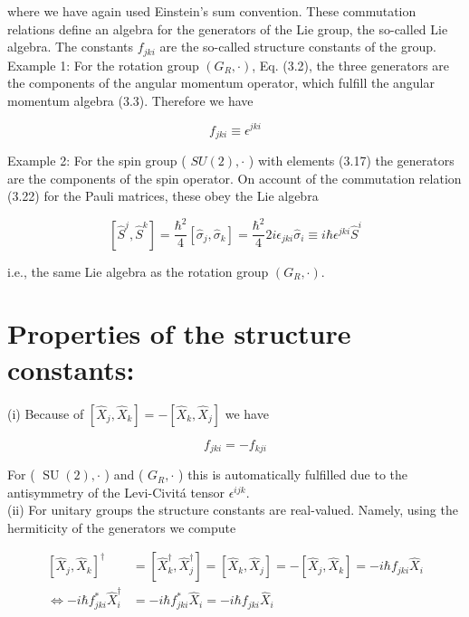 \documentclass[10pt, letterpaper]{article}
\begin{document}
where we have again used Einstein's sum convention. These commutation relations define an algebra for the generators of the Lie group, the so-called Lie algebra. The constants $f_{j k i}$ are the so-called structure constants of the group.\\
Example 1: For the rotation group $\left(G_{R}, \cdot\right)$, Eq. (3.2), the three generators are the components of the angular momentum operator, which fulfill the angular momentum algebra (3.3). Therefore we have

$$
f_{j k i} \equiv \epsilon^{j k i}
$$

Example 2: For the spin group ( $S U(2), \cdot$ ) with elements (3.17) the generators are the components of the spin operator. On account of the commutation relation (3.22) for the Pauli matrices, these obey the Lie algebra

$$
\left[\hat{S}^{j}, \hat{S}^{k}\right]=\frac{\hbar^{2}}{4}\left[\hat{\sigma}_{j}, \hat{\sigma}_{k}\right]=\frac{\hbar^{2}}{4} 2 i \epsilon_{j k i} \hat{\sigma}_{i} \equiv i \hbar \epsilon^{j k i} \hat{S}^{i}
$$

i.e., the same Lie algebra as the rotation group $\left(G_{R}, \cdot\right)$.

\section{Properties of the structure constants:}
(i) Because of $\left[\hat{X}_{j}, \hat{X}_{k}\right]=-\left[\hat{X}_{k}, \hat{X}_{j}\right]$ we have

$$
f_{j k i}=-f_{k j i}
$$

For ( $\operatorname{SU}(2), \cdot$ ) and ( $G_{R}, \cdot$ ) this is automatically fulfilled due to the antisymmetry of the Levi-Civitá tensor $\epsilon^{i j k}$.\\
(ii) For unitary groups the structure constants are real-valued. Namely, using the hermiticity of the generators we compute

$$
\begin{aligned}
{\left[\hat{X}_{j}, \hat{X}_{k}\right]^{\dagger} } & =\left[\hat{X}_{k}^{\dagger}, \hat{X}_{j}^{\dagger}\right]=\left[\hat{X}_{k}, \hat{X}_{j}\right]=-\left[\hat{X}_{j}, \hat{X}_{k}\right]=-i \hbar f_{j k i} \hat{X}_{i} \\
\Longleftrightarrow-i \hbar f_{j k i}^{*} \hat{X}_{i}^{\dagger} & =-i \hbar f_{j k i}^{*} \hat{X}_{i}=-i \hbar f_{j k i} \hat{X}_{i}
\end{aligned}
$$
\end{document}
